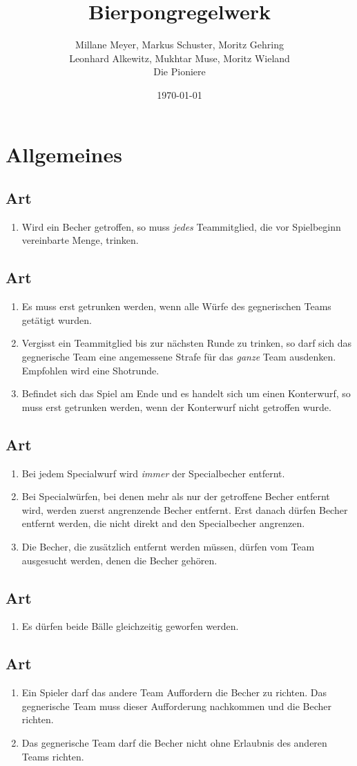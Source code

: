 \documentclass[a4paper,11pt]{scrartcl}
\title{\Huge{Bierpongregelwerk}}
\author{Millane Meyer, Markus Schuster, Moritz Gehring \\Leonhard Alkewitz, Mukhtar Muse, Moritz Wieland \\\tiny{Die Pioniere}}
\date{\small{\today}}
\newcommand{\enum}[1]{\begin{enumerate}[label=(\arabic*)]#1\end{enumerate}}
\newcommand{\art}[2]{\subsection*{#1} \enum{#2}}
\newcounter{art}
\begin{document}
 
\maketitle
\vspace*{-1cm}
\newpage

\section{Allgemeines}
    \art{Art \theart}{
        \item
            Wird ein Becher getroffen, so muss \emph{jedes} Teammitglied, die vor Spielbeginn vereinbarte Menge, trinken.
    }

    \art{Art \theart}{
        \item
            Es muss erst getrunken werden, wenn alle Würfe des gegnerischen Teams getätigt wurden.
        \item
            Vergisst ein Teammitglied bis zur nächsten Runde zu trinken, so darf sich das gegnerische Team eine angemessene Strafe für das \emph{ganze} Team ausdenken. Empfohlen wird eine Shotrunde.
        \item
            Befindet sich das Spiel am Ende und es handelt sich um einen Konterwurf, so muss erst getrunken werden, wenn der Konterwurf nicht getroffen wurde.
    }

    \art{Art \theart}{
        \item
            Bei jedem Specialwurf wird \emph{immer} der Specialbecher entfernt.
        \item
            Bei Specialwürfen, bei denen mehr als nur der getroffene Becher entfernt wird, werden zuerst angrenzende Becher entfernt. Erst danach dürfen Becher entfernt werden, die nicht direkt and den Specialbecher angrenzen.
        \item
            Die Becher, die zusätzlich entfernt werden müssen, dürfen vom Team ausgesucht werden, denen die Becher gehören.
    }

    \art{Art \theart}{
        \item
            Es dürfen beide Bälle gleichzeitig geworfen werden.
    }

    \art{Art \theart}{
        \item
            Ein Spieler darf das andere Team Auffordern die Becher zu richten. Das gegnerische Team muss dieser Aufforderung nachkommen und die Becher richten.
        \item
            Das gegnerische Team darf die Becher nicht ohne Erlaubnis des anderen Teams richten.
    }
\end{document}
